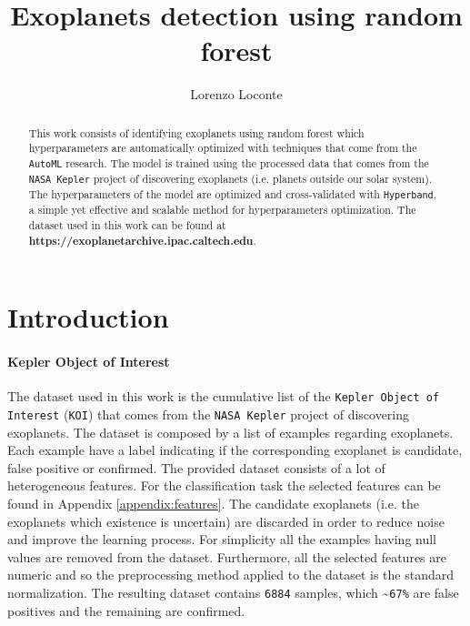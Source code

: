 \documentclass[11pt, a4paper]{article}
\date{}
\title{Exoplanets detection using random forest}
\author{Lorenzo Loconte}
\begin{document}
\maketitle
\begin{abstract}
  This work consists of identifying exoplanets using random forest which hyperparameters are automatically optimized with techniques that come from the \texttt{AutoML} research.
  The model is trained using the processed data that comes from the \texttt{NASA Kepler} project of discovering exoplanets (i.e. planets outside our solar system).
  The hyperparameters of the model are optimized and cross-validated with \texttt{Hyperband}, a simple yet effective and scalable method for hyperparameters optimization.
  The dataset used in this work can be found at \textbf{https://exoplanetarchive.ipac.caltech.edu}.
\end{abstract}

\section{Introduction}
  \paragraph{Kepler Object of Interest}
    The dataset used in this work is the cumulative list of the \texttt{Kepler Object of Interest} (\texttt{KOI}) that comes from the \texttt{NASA Kepler} project of discovering exoplanets.
    The dataset is composed by a list of examples regarding exoplanets. Each example have a label indicating if the corresponding exoplanet is candidate, false positive or confirmed. The provided dataset consists of a lot of heterogeneous features. For the classification task the selected features can be found in Appendix \ref{appendix:features}. The candidate exoplanets (i.e. the exoplanets which existence is uncertain) are discarded in order to reduce noise and improve the learning process.
    For simplicity all the examples having null values are removed from the dataset. Furthermore, all the selected features are numeric and so the preprocessing method applied to the dataset is the standard normalization.
    The resulting dataset contains \texttt{6884} samples, which \textasciitilde \texttt{67\%} are false positives and the remaining are confirmed.
    
\end{document}
